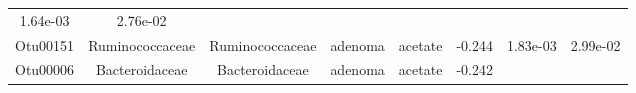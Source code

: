 \documentclass[11pt,]{article}
\begin{document}
\begin{longtable}[]{@{}cccccccc@{}}
\begin{minipage}[t]{0.08\columnwidth}
1.64e-03\strut
\end{minipage} & \begin{minipage}[t]{0.08\columnwidth}\centering\strut
2.76e-02\strut
\end{minipage}\tabularnewline
\begin{minipage}[t]{0.08\columnwidth}\centering\strut
Otu00151\strut
\end{minipage} & \begin{minipage}[t]{0.15\columnwidth}\centering\strut
Ruminococcaceae\strut
\end{minipage} & \begin{minipage}[t]{0.15\columnwidth}\centering\strut
Ruminococcaceae\strut
\end{minipage} & \begin{minipage}[t]{0.08\columnwidth}\centering\strut
adenoma\strut
\end{minipage} & \begin{minipage}[t]{0.09\columnwidth}\centering\strut
acetate\strut
\end{minipage} & \begin{minipage}[t]{0.07\columnwidth}\centering\strut
-0.244\strut
\end{minipage} & \begin{minipage}[t]{0.08\columnwidth}\centering\strut
1.83e-03\strut
\end{minipage} & \begin{minipage}[t]{0.08\columnwidth}\centering\strut
2.99e-02\strut
\end{minipage}\tabularnewline
\begin{minipage}[t]{0.08\columnwidth}\centering\strut
Otu00006\strut
\end{minipage} & \begin{minipage}[t]{0.15\columnwidth}\centering\strut
Bacteroidaceae\strut
\end{minipage} & \begin{minipage}[t]{0.15\columnwidth}\centering\strut
Bacteroidaceae\strut
\end{minipage} & \begin{minipage}[t]{0.08\columnwidth}\centering\strut
adenoma\strut
\end{minipage} & \begin{minipage}[t]{0.09\columnwidth}\centering\strut
acetate\strut
\end{minipage} & \begin{minipage}[t]{0.07\columnwidth}\centering\strut
-0.242\strut
\end{minipage} & \begin{minipage}[t]{0.08\columnwidth}\centering\strut

\end{minipage}
\end{longtable}
\end{document}
